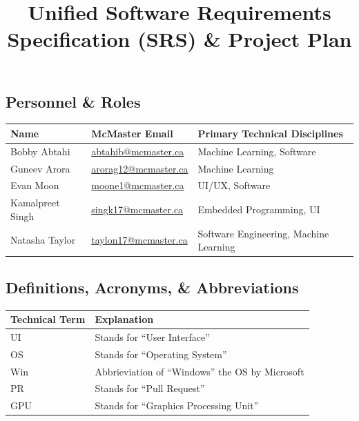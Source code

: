 \documentclass{article}
\title{Unified Software Requirements Specification (SRS) \& Project Plan}
\author{}
\date{}
\newcommand{\linkemail}[1]{\href{mailto:#1}{#1}}
\newcommand{\partsection}{%
    \section[Part \Roman{section}]{}
}
\begin{document}
\maketitle
\thispagestyle{fancy}

\partsection{}

\subsection{Personnel \& Roles}

\renewcommand{\arraystretch}{1.5}
\begin{tabularx}{\textwidth}{|l|l|X|}
    \hline
    \rowcolor{lightgray}
    \textbf{Name} & \textbf{McMaster Email} & \textbf{Primary Technical Disciplines} \\
    \hline Bobby Abtahi     & \linkemail{abtahib@mcmaster.ca}  & Machine Learning, Software \\
    \hline Guneev Arora     & \linkemail{arorag12@mcmaster.ca} & Machine Learning \\
    \hline Evan Moon        & \linkemail{moone1@mcmaster.ca}   & UI/UX, Software \\
    \hline Kamalpreet Singh & \linkemail{singk17@mcmaster.ca}  & Embedded Programming, UI \\
    \hline Natasha Taylor   & \linkemail{taylon17@mcmaster.ca} & Software Engineering, Machine Learning \\
    \hline
\end{tabularx}


\subsection{Definitions, Acronyms, \& Abbreviations}

\begin{tabularx}{\textwidth}{|l|X|}
    \hline
    \rowcolor{lightgray}
    \textbf{Technical Term} & \textbf{Explanation} \\
    \hline UI  & Stands for ``User Interface'' \\
    \hline OS  & Stands for ``Operating System'' \\
    \hline Win & Abbrieviation of ``Windows'' the OS by Microsoft \\
    \hline PR & Stands for ``Pull Request'' \\
    \hline GPU & Stands for ``Graphics Processing Unit'' \\
    \hline 
\end{tabularx}
\end{document}
